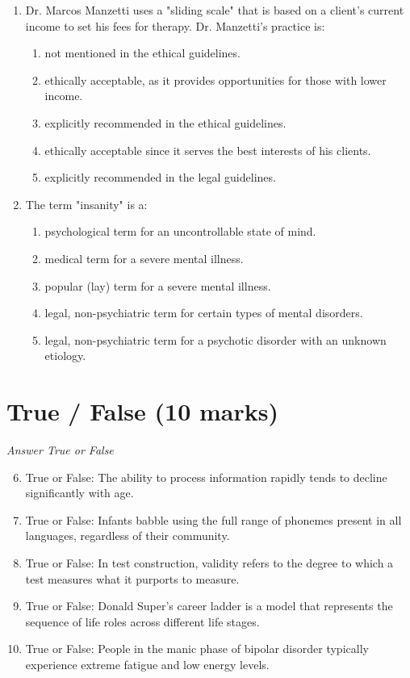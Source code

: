 \documentclass[12pt]{article}
\begin{document}
\begin{enumerate}[label=\arabic*.]
\item Dr. Marcos Manzetti uses a "sliding scale" that is based on a client's current income to set his fees for therapy. Dr. Manzetti's practice is:
\begin{enumerate}[label=(\alph*)]
    \item not mentioned in the ethical guidelines.
    \item ethically acceptable, as it provides opportunities for those with lower income.
    \item explicitly recommended in the ethical guidelines.
    \item ethically acceptable since it serves the best interests of his clients.
    \item explicitly recommended in the legal guidelines.
\end{enumerate}
\item The term "insanity" is a:
\begin{enumerate}[label=(\alph*)]
    \item psychological term for an uncontrollable state of mind.
    \item medical term for a severe mental illness.
    \item popular (lay) term for a severe mental illness.
    \item legal, non-psychiatric term for certain types of mental disorders.
    \item legal, non-psychiatric term for a psychotic disorder with an unknown etiology.
\end{enumerate}
\end{enumerate}

\section*{True / False (10 marks)}
\textit{Answer True or False}
\begin{enumerate}[label=\arabic*.]
\setcounter{enumi}{5}
\item True or False: The ability to process information rapidly tends to decline significantly with age.
\item True or False: Infants babble using the full range of phonemes present in all languages, regardless of their community.
\item True or False: In test construction, validity refers to the degree to which a test measures what it purports to measure.
\item True or False: Donald Super's career ladder is a model that represents the sequence of life roles across different life stages.
\item True or False: People in the manic phase of bipolar disorder typically experience extreme fatigue and low energy levels.
\end{enumerate}
\end{document}
